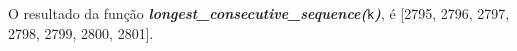 \documentclass[12pt,varwidth=16cm,border=1pt]{standalone}
\begin{document}
O resultado da função \textbf{\textit{longest\_consecutive\_sequence(}}\verb+k+\textbf{\textit{)}}, é [2795, 2796, 2797, 2798, 2799, 2800, 2801].

\questiomtrue
\end{document}
